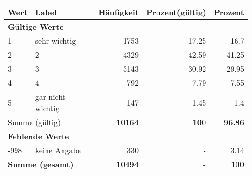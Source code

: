     \begin{longtable}{lXrrr}
     \toprule
     \textbf{Wert} & \textbf{Label} & \textbf{Häufigkeit} & \textbf{Prozent(gültig)} & \textbf{Prozent} \\
     \endhead
     \midrule
     \multicolumn{5}{l}{\textbf{Gültige Werte}}\\

     1 &
     \multicolumn{1}{X}{ sehr wichtig   } &


       \num{1753} &
       \num[round-mode=places,round-precision=2]{17,25} &
         \num[round-mode=places,round-precision=2]{16,7} \\

     2 &
     \multicolumn{1}{X}{ 2   } &


       \num{4329} &
       \num[round-mode=places,round-precision=2]{42,59} &
         \num[round-mode=places,round-precision=2]{41,25} \\

     3 &
     \multicolumn{1}{X}{ 3   } &


       \num{3143} &
       \num[round-mode=places,round-precision=2]{30,92} &
         \num[round-mode=places,round-precision=2]{29,95} \\

     4 &
     \multicolumn{1}{X}{ 4   } &


       \num{792} &
       \num[round-mode=places,round-precision=2]{7,79} &
         \num[round-mode=places,round-precision=2]{7,55} \\

     5 &
     \multicolumn{1}{X}{ gar nicht wichtig   } &


       \num{147} &
       \num[round-mode=places,round-precision=2]{1,45} &
         \num[round-mode=places,round-precision=2]{1,4} \\
     \midrule
     \multicolumn{2}{l}{Summe (gültig)} &
       \textbf{\num{10164}} &
     \textbf{100} &
       \textbf{\num[round-mode=places,round-precision=2]{96,86}} \\
     \multicolumn{5}{l}{\textbf{Fehlende Werte}}\\
       -998 &
       keine Angabe &
         \num{330} &
        - &
         \num[round-mode=places,round-precision=2]{3,14} \\
     \midrule
     \multicolumn{2}{l}{\textbf{Summe (gesamt)}} &
          \textbf{\num{10494}} &
        \textbf{-} &
        \textbf{100} \\
     \bottomrule
     \end{longtable}
     

